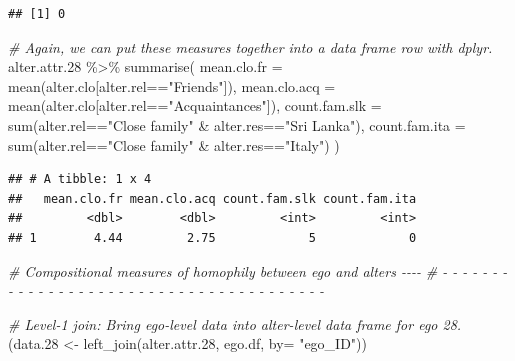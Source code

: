 \documentclass[
]{book}
\newenvironment{Shaded}{\begin{snugshade}}{\end{snugshade}}
\newcommand{\AttributeTok}[1]{\textcolor[rgb]{0.77,0.63,0.00}{#1}}
\newcommand{\CommentTok}[1]{\textcolor[rgb]{0.56,0.35,0.01}{\textit{#1}}}
\newcommand{\FloatTok}[1]{\textcolor[rgb]{0.00,0.00,0.81}{#1}}
\newcommand{\FunctionTok}[1]{\textcolor[rgb]{0.00,0.00,0.00}{#1}}
\newcommand{\NormalTok}[1]{#1}
\newcommand{\OtherTok}[1]{\textcolor[rgb]{0.56,0.35,0.01}{#1}}
\newcommand{\SpecialCharTok}[1]{\textcolor[rgb]{0.00,0.00,0.00}{#1}}
\newcommand{\StringTok}[1]{\textcolor[rgb]{0.31,0.60,0.02}{#1}}
\begin{document}
\begin{Shaded}
\end{Shaded}

\begin{verbatim}
## [1] 0
\end{verbatim}

\begin{Shaded}
\begin{Highlighting}[]
\CommentTok{\# Again, we can put these measures together into a data frame row with dplyr.}
\NormalTok{alter.attr}\FloatTok{.28} \SpecialCharTok{\%\textgreater{}\%}
  \FunctionTok{summarise}\NormalTok{(}
    \AttributeTok{mean.clo.fr =} \FunctionTok{mean}\NormalTok{(alter.clo[alter.rel}\SpecialCharTok{==}\StringTok{"Friends"}\NormalTok{]), }
    \AttributeTok{mean.clo.acq =} \FunctionTok{mean}\NormalTok{(alter.clo[alter.rel}\SpecialCharTok{==}\StringTok{"Acquaintances"}\NormalTok{]),}
    \AttributeTok{count.fam.slk =} \FunctionTok{sum}\NormalTok{(alter.rel}\SpecialCharTok{==}\StringTok{"Close family"} \SpecialCharTok{\&}\NormalTok{ alter.res}\SpecialCharTok{==}\StringTok{"Sri Lanka"}\NormalTok{),}
    \AttributeTok{count.fam.ita =} \FunctionTok{sum}\NormalTok{(alter.rel}\SpecialCharTok{==}\StringTok{"Close family"} \SpecialCharTok{\&}\NormalTok{ alter.res}\SpecialCharTok{==}\StringTok{"Italy"}\NormalTok{)}
\NormalTok{  )}
\end{Highlighting}
\end{Shaded}

\begin{verbatim}
## # A tibble: 1 x 4
##   mean.clo.fr mean.clo.acq count.fam.slk count.fam.ita
##         <dbl>        <dbl>         <int>         <int>
## 1        4.44         2.75             5             0
\end{verbatim}

\begin{Shaded}
\begin{Highlighting}[]
\CommentTok{\# Compositional measures of homophily between ego and alters                {-}{-}{-}{-}}
\CommentTok{\# {-} {-} {-} {-} {-} {-} {-} {-} {-} {-} {-} {-} {-} {-} {-} {-} {-} {-} {-} {-} {-} {-} {-} {-} {-} {-} {-} {-} {-} {-} {-} {-} {-} {-} {-} {-} {-} {-} {-} }

\CommentTok{\# Level{-}1 join: Bring ego{-}level data into alter{-}level data frame for ego 28.}
\NormalTok{(data}\FloatTok{.28} \OtherTok{\textless{}{-}} \FunctionTok{left\_join}\NormalTok{(alter.attr}\FloatTok{.28}\NormalTok{, ego.df, }\AttributeTok{by=} \StringTok{"ego\_ID"}\NormalTok{))}
\end{Highlighting}
\end{Shaded}
\end{document}

